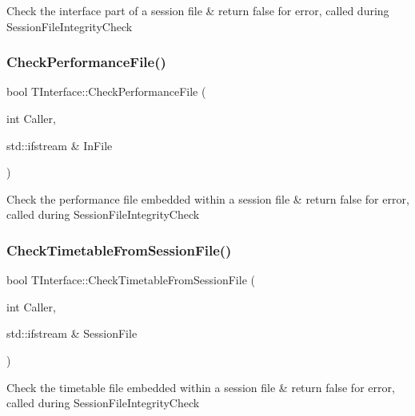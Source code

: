 Check the interface part of a session file \& return false for error, called during Session\+File\+Integrity\+Check \mbox{\label{class_t_interface_ace78190347eb85b1048e5309075d04b0}} 
\subsubsection{\texorpdfstring{Check\+Performance\+File()}{CheckPerformanceFile()}}
{\footnotesize\ttfamily bool T\+Interface\+::\+Check\+Performance\+File (\begin{DoxyParamCaption}\item[{int}]{Caller,  }\item[{std\+::ifstream \&}]{In\+File }\end{DoxyParamCaption})\hspace{0.3cm}{\ttfamily [private]}}

Check the performance file embedded within a session file \& return false for error, called during Session\+File\+Integrity\+Check \mbox{\label{class_t_interface_a1c76c13d451cb6955d77d37e68614811}} 
\subsubsection{\texorpdfstring{Check\+Timetable\+From\+Session\+File()}{CheckTimetableFromSessionFile()}}
{\footnotesize\ttfamily bool T\+Interface\+::\+Check\+Timetable\+From\+Session\+File (\begin{DoxyParamCaption}\item[{int}]{Caller,  }\item[{std\+::ifstream \&}]{Session\+File }\end{DoxyParamCaption})\hspace{0.3cm}{\ttfamily [private]}}

Check the timetable file embedded within a session file \& return false for error, called during Session\+File\+Integrity\+Check \mbox{\label{class_t_interface_a686430e962991bc32742399164187b62}} 
